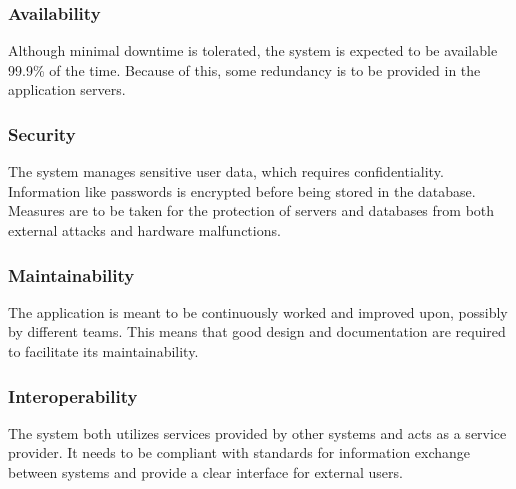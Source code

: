 \subsubsection{Availability}
Although minimal downtime is tolerated, the system is expected to be available 99.9\% of the time. Because of this, some redundancy is to be provided in the application servers.

\subsubsection{Security}
The system manages sensitive user data, which requires confidentiality. Information like passwords is encrypted before being stored in the database.
Measures are to be taken for the protection of servers and databases from both external attacks and hardware malfunctions.


\subsubsection{Maintainability}
The application is meant to be continuously worked and improved upon, possibly by different teams. This means that good design and documentation are required to facilitate its maintainability.

\subsubsection{Interoperability}
The system both utilizes services provided by other systems and acts as a service provider. It needs to be compliant with standards for information exchange between systems and provide a clear interface for external users.
